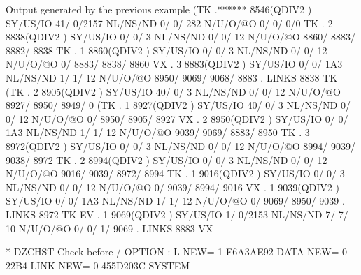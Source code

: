 \begin{landscapebody}
\begin{XMPt}{Output generated by the previous example}
(TK  .******     8546(QDIV2   ) SY/US/IO   41/    0/2157 NL/NS/ND    0/    0/     282 N/U/O/@O       0/       0/       0/0       
 TK  .     2     8838(QDIV2   ) SY/US/IO    0/    0/   3 NL/NS/ND    0/    0/      12 N/U/O/@O    8860/    8883/    8882/    8838
 TK  .     1     8860(QDIV2   ) SY/US/IO    0/    0/   3 NL/NS/ND    0/    0/      12 N/U/O/@O       0/    8883/    8838/    8860
 VX  .     3     8883(QDIV2   ) SY/US/IO    0/    0/ 1A3 NL/NS/ND    1/    1/      12 N/U/O/@O    8950/    9069/    9068/    8883
     . LINKS      8838 TK                                                                                                        
(TK  .     2     8905(QDIV2   ) SY/US/IO   40/    0/   3 NL/NS/ND    0/    0/      12 N/U/O/@O    8927/    8950/    8949/       0
(TK  .     1     8927(QDIV2   ) SY/US/IO   40/    0/   3 NL/NS/ND    0/    0/      12 N/U/O/@O       0/    8950/    8905/    8927
 VX  .     2     8950(QDIV2   ) SY/US/IO    0/    0/ 1A3 NL/NS/ND    1/    1/      12 N/U/O/@O    9039/    9069/    8883/    8950
 TK  .     3     8972(QDIV2   ) SY/US/IO    0/    0/   3 NL/NS/ND    0/    0/      12 N/U/O/@O    8994/    9039/    9038/    8972
 TK  .     2     8994(QDIV2   ) SY/US/IO    0/    0/   3 NL/NS/ND    0/    0/      12 N/U/O/@O    9016/    9039/    8972/    8994
 TK  .     1     9016(QDIV2   ) SY/US/IO    0/    0/   3 NL/NS/ND    0/    0/      12 N/U/O/@O       0/    9039/    8994/    9016
 VX  .     1     9039(QDIV2   ) SY/US/IO    0/    0/ 1A3 NL/NS/ND    1/    1/      12 N/U/O/@O       0/    9069/    8950/    9039
     . LINKS      8972 TK                                                                                                        
 EV  .     1     9069(QDIV2   ) SY/US/IO    1/    0/2153 NL/NS/ND    7/    7/      10 N/U/O/@O       0/       0/       1/    9069
     . LINKS      8883 VX                                                                                                        
                                                                                                                                 
* DZCHST Check before        / OPTION : L     NEW=   1         F6A3AE92                                     DATA                 
                                              NEW=   0             22B4                                     LINK                 
                                              NEW=   0         455D203C                                     SYSTEM               
                                                                                                                                 

\end{XMPt}
\end{landscapebody}
